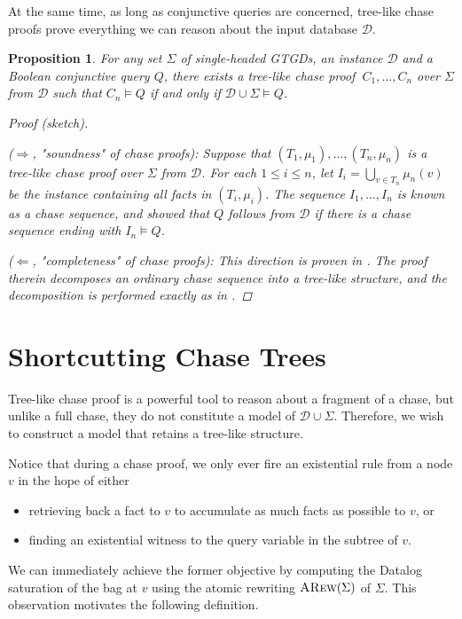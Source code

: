 \documentclass[12pt]{report}
\theoremstyle{plain}
\newtheorem{proposition}[theorem]{Proposition}
\theoremstyle{definition}
\newcommand{\ARew}[1]{\ensuremath{\normalfont{\textsc{ARew}}\!\left( #1 \right)}}
\begin{document}
At the same time, as long as conjunctive queries are concerned, tree-like chase proofs prove everything we can reason about the input database $\mathcal{D}$.

\begin{proposition}
\label{proposition:chase-proof-completeness}
  For any set $\Sigma$ of single-headed GTGDs, an instance $\mathcal{D}$ and a Boolean conjunctive query $Q$, there exists a tree-like chase proof $\ C_1, \ldots, C_n$ over $\Sigma$ from $\mathcal{D}$ such that $C_n \models Q$ if and only if $\mathcal{D} \cup \Sigma \models Q$.
  \begin{proof}[Proof (sketch)] $ $\par
    ($\Longrightarrow$, "soundness" of chase proofs): Suppose that $(T_1, \mu_1), \ldots, (T_n, \mu_n)$ is a tree-like chase proof over $\Sigma$ from $\mathcal{D}$. For each $1 \leq i \leq n$, let $I_i = \bigcup_{v \in T_n} \mu_n(v)$ be the instance containing all facts in $(T_i, \mu_i)$. The sequence $I_1, \ldots, I_n$ is known as a \emph{chase sequence}, and \cite{fagin_kolaitis_miller_popa_2005} showed that $Q$ follows from $\mathcal{D}$ if there is a chase sequence ending with $I_n \models Q$.

    ($\Longleftarrow$, "completeness" of chase proofs): This direction is proven in \cite[Proposition 2.6.9]{kappelmann_2019}. The proof therein decomposes an ordinary chase sequence into a tree-like structure, and the decomposition is performed exactly as in .
  \end{proof}
\end{proposition}

\section{Shortcutting Chase Trees}

Tree-like chase proof is a powerful tool to reason about a fragment of a chase, but unlike a full chase, they do not constitute a model of $\mathcal{D} \cup \Sigma$. Therefore, we wish to construct a model that retains a tree-like structure.

Notice that during a chase proof, we only ever fire an existential rule from a node $v$ in the hope of either
\begin{itemize}
  \item retrieving back a fact to $v$ to accumulate as much facts as possible to $v$, or
  \item finding an existential witness to the query variable in the subtree of $v$.
\end{itemize}
We can immediately achieve the former objective by computing the Datalog saturation of the bag at $v$ using the atomic rewriting $\ARew{\Sigma}$ of $\Sigma$. This observation motivates the following definition.
\end{document}
